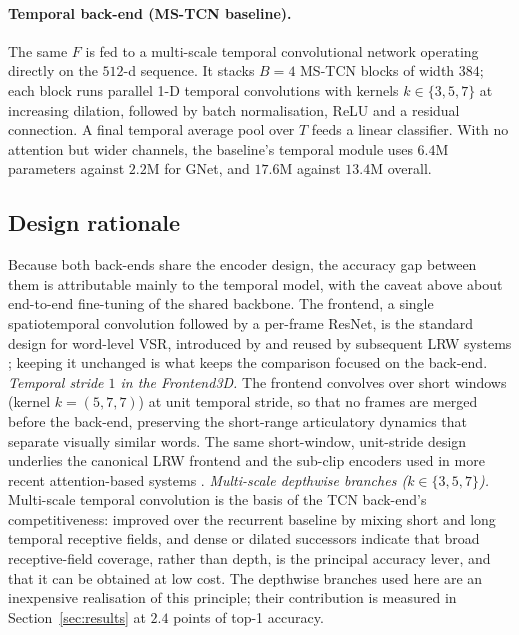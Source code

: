 \documentclass[10pt, a4paper]{article}
\begin{document}
\paragraph{Temporal back-end (MS-TCN baseline).}
The same $F$ is fed to a multi-scale temporal convolutional network operating directly on the $512$-d sequence. It stacks $B = 4$ MS-TCN blocks of width $384$; each block runs parallel 1-D temporal convolutions with kernels $k \in \{3,5,7\}$ at increasing dilation, followed by batch normalisation, ReLU and a residual connection. A final temporal average pool over $T$ feeds a linear classifier. With no attention but wider channels, the baseline's temporal module uses $6.4$M parameters against $2.2$M for GNet, and $17.6$M against $13.4$M overall.
\subsection{Design rationale}
\noindent Because both back-ends share the encoder design, the accuracy gap between them is attributable mainly to the temporal model, with the caveat above about end-to-end fine-tuning of the shared backbone. The frontend, a single spatiotemporal convolution followed by a per-frame ResNet, is the standard design for word-level VSR, introduced by \citet{stafylakis2017combining} and reused by subsequent LRW systems \citep{martinez2020lipreading, ma2021densely}; keeping it unchanged is what keeps the comparison focused on the back-end.
\noindent\emph{Temporal stride $1$ in the Frontend3D.} The frontend convolves over short windows (kernel $k=(5,7,7)$) at unit temporal stride, so that no frames are merged before the back-end, preserving the short-range articulatory dynamics that separate visually similar words. The same short-window, unit-stride design underlies the canonical LRW frontend \citep{stafylakis2017combining} and the sub-clip encoders used in more recent attention-based systems \citep{prajwal2022subword}.
\noindent\emph{Multi-scale depthwise branches ($k\in\{3,5,7\}$).} Multi-scale temporal convolution is the basis of the TCN back-end's competitiveness: \citet{martinez2020lipreading} improved over the recurrent baseline by mixing short and long temporal receptive fields, and dense or dilated successors \citep{ma2021densely, lee2025td3net} indicate that broad receptive-field coverage, rather than depth, is the principal accuracy lever, and that it can be obtained at low cost. The depthwise branches used here are an inexpensive realisation of this principle; their contribution is measured in Section~\ref{sec:results} at $2.4$ points of top-1 accuracy.
\end{document}
